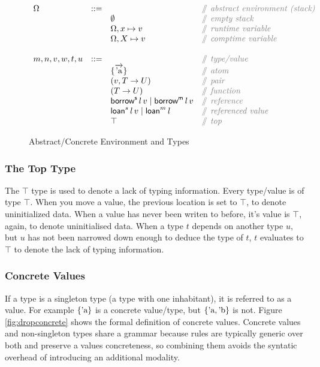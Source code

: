 \documentclass[12pt,twoside]{report}
\begin{document}
\begin{figure}[H]
  \arraycolsep=1pt %
  \centering

  \vspace{-2ex} %
  \[
  \begin{array}[t]{llll}
    \Omega & ::= & & \comment{abstract environment (stack)} \\
    && \emptyset & \comment{empty stack} \\
    && \Omega, x \mapsto v & \comment{runtime variable} \\
    && \Omega, X \mapsto v & \comment{comptime variable} \\
    \\
    m, n, v, w, t, u & ::= & & \comment{type/value} \\
    && \{\overrightarrow{\atom{a}}\} & \comment{atom} \\
    && (v, T \rightarrow U) & \comment{pair} \\
    && (T \rightarrow U) & \comment{function} \\
    && \borrows{l}{v} \mid \borrowm{l}{v} & \comment{reference} \\
    && \loans{l}{v} \mid \loanm{l} & \comment{referenced value} \\
    && \top & \comment{top} \\
  \end{array} %
  \]
\caption{Abstract/Concrete Environment and Types} %
\label{fig:stack} %
\end{figure} %

\subsubsection{The Top Type}
The $\top$ type is used to denote a lack of typing information. Every type/value is of type $\top$. When you move a value, the previous location is set to $\top$, to denote uninitialized data. When a value has never been writen to before, it's value is $\top$, again, to denote uninitialised data. When a type $t$ depends on another type $u$, but $u$ has not been narrowed down enough to deduce the type of $t$, $t$ evaluates to $\top$ to denote the lack of typing information.

\subsubsection{Concrete Values}
If a type is a singleton type (a type with one inhabitant), it is referred to as a value. For example $\{ \text{'a} \}$ is a concrete value/type, but $\{ \text{'a}, \text{'b} \}$ is not. Figure \ref{fig:dropconcrete} shows the formal definition of concrete values. Concrete values and non-singleton types share a grammar because rules are typically generic over both and preserve a values concreteness, so combining them avoids the syntatic overhead of introducing an additional modality.
\end{document}

